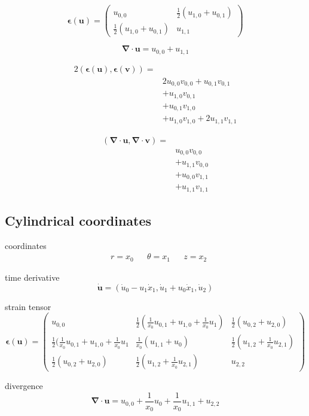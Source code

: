 \documentclass{scrartcl}
\newcommand{\vect}[1]{\boldsymbol{#1}}
\newcommand{\ten}[1]{\boldsymbol{#1}}
\begin{document}
\[
\ten{\epsilon}(\vect{u}) =
\begin{pmatrix}
u_{0,0} & \frac{1}{2}(u_{1,0} + u_{0,1}) \\
\frac{1}{2}(u_{1,0} + u_{0,1}) & u_{1,1}
\end{pmatrix}
\]

\[
\vect{\nabla} \cdot \vect{u} = u_{0,0} + u_{1,1}
\]

\begin{align*}
2(\ten{\epsilon}(\vect{u}), \ten{\epsilon}(\vect{v})) =& \\
&2 u_{0,0} v_{0,0} + u_{0,1} v_{0,1} \\
&+ u_{1,0} v_{0,1} \\
&+ u_{0,1} v_{1,0} \\
&+ u_{1,0} v_{1,0} + 2 u_{1,1} v_{1,1}
\end{align*}

\begin{align*}
(\vect{\nabla} \cdot \vect{u}, \vect{\nabla} \cdot \vect{v}) =& \\
& u_{0,0} v_{0,0} \\
&+ u_{1,1} v_{0,0} \\
&+ u_{0,0} v_{1,1} \\
&+ u_{1,1} v_{1,1}
\end{align*}

\subsection{Cylindrical coordinates}

coordinates
\begin{align*}
&r = x_0 & &\theta = x_1 & &z = x_2
\end{align*}

time derivative
\[
\dot{\vect{u}} = ( \dot{u}_0 - u_1 \dot{x}_1, \dot{u}_1 
+ u_0 \dot{x}_1, \dot{u}_2 )
\]

strain tensor
\[
\ten{\epsilon}(\vect{u}) = 
\begin{pmatrix}
u_{0,0} & \frac{1}{2}(\frac{1}{x_0}u_{0,1} + u_{1,0} + \frac{1}{x_0}u_1) &
\frac{1}{2}(u_{0,2} + u_{2,0}) \\
\frac{1}{2}(\frac{1}{x_0}u_{0,1} + u_{1,0} + \frac{1}{x_0}u_1 &
\frac{1}{x_0}(u_{1,1} + u_0) & \frac{1}{2}(u_{1,2} + \frac{1}{x_0}u_{2,1}) \\
\frac{1}{2}(u_{0,2} + u_{2,0}) & \frac{1}{2}(u_{1,2} + \frac{1}{x_0}u_{2,1}) &
u_{2,2} 
\end{pmatrix}
\]

divergence
\[
\vect{\nabla} \cdot \vect{u} = u_{0,0} + \frac{1}{x_0}u_0 + \frac{1}{x_0}u_{1,1}
+ u_{2,2}
\]
\end{document}
